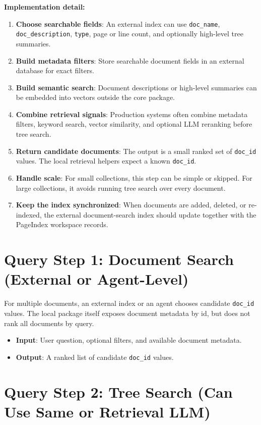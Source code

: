 \documentclass[11pt,a4paper]{article}
\newcommand{\fieldname}[1]{\textcolor{red!70!black}{\texttt{#1}}}
\begin{document}
\noindent\textbf{Implementation detail:}
\begin{enumerate}
    \item \textbf{Choose searchable fields}: An external index can use \fieldname{doc\_name}, \fieldname{doc\_description}, \fieldname{type}, page or line count, and optionally high-level tree summaries.
    \item \textbf{Build metadata filters}: Store searchable document fields in an external database for exact filters.
    \item \textbf{Build semantic search}: Document descriptions or high-level summaries can be embedded into vectors outside the core package.
    \item \textbf{Combine retrieval signals}: Production systems often combine metadata filters, keyword search, vector similarity, and optional LLM reranking before tree search.
    \item \textbf{Return candidate documents}: The output is a small ranked set of \fieldname{doc\_id} values. The local retrieval helpers expect a known \fieldname{doc\_id}.
    \item \textbf{Handle scale}: For small collections, this step can be simple or skipped. For large collections, it avoids running tree search over every document.
    \item \textbf{Keep the index synchronized}: When documents are added, deleted, or re-indexed, the external document-search index should update together with the PageIndex workspace records.
\end{enumerate}

\section{Query Step 1: Document Search (External or Agent-Level)}

For multiple documents, an external index or an agent chooses candidate \fieldname{doc\_id} values. The local package itself exposes document metadata by id, but does not rank all documents by query.

\begin{itemize}
    \item \textbf{Input}: User question, optional filters, and available document metadata.
    \item \textbf{Output}: A ranked list of candidate \fieldname{doc\_id} values.
\end{itemize}

\section{Query Step 2: Tree Search (Can Use Same or Retrieval LLM)}
\end{document}
